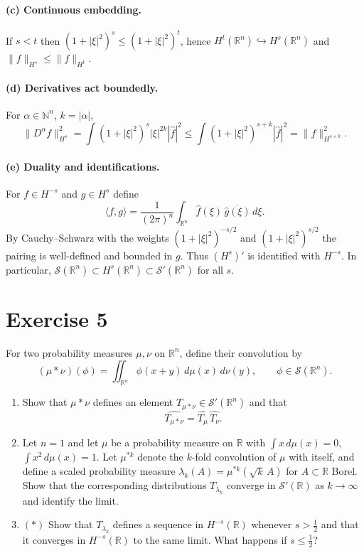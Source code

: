 \documentclass[12pt,a4paper]{article}
\theoremstyle{plain}
\theoremstyle{definition}
\theoremstyle{remark}
\theoremstyle{remark}
\begin{document}
\smallskip

\paragraph{(c) Continuous embedding.}
If $s<t$ then $(1+|\xi|^2)^s\le(1+|\xi|^2)^t$, hence $H^t(\mathbb R^n)\hookrightarrow H^s(\mathbb R^n)$ and
$\|f\|_{H^s}\le \|f\|_{H^t}$.

\smallskip

\paragraph{(d) Derivatives act boundedly.}
For $\alpha\in\mathbb N^n$, $k=|\alpha|$,
\[
\|D^\alpha f\|_{H^s}^2
=\int (1+|\xi|^2)^s |\xi|^{2k} |\widehat f|^2
\le \int (1+|\xi|^2)^{s+k} |\widehat f|^2
=\|f\|_{H^{s+k}}^2.
\]

\smallskip

\paragraph{(e) Duality and identifications.}
For $f\in H^{-s}$ and $g\in H^s$ define
\[
\langle f,g\rangle=\frac{1}{(2\pi)^n}\int_{\mathbb R^n}\widehat f(\xi)\,\overline{\widehat g(\xi)}\,d\xi.
\]
By Cauchy--Schwarz with the weights $(1+|\xi|^2)^{-s/2}$ and $(1+|\xi|^2)^{s/2}$ the pairing is well-defined and bounded in $g$.
Thus $(H^s)'$ is identified with $H^{-s}$. In particular, $\mathcal S(\mathbb R^n)\subset H^s(\mathbb R^n)\subset\mathcal S'(\mathbb R^n)$ for all $s$.

\bigskip

\section*{Exercise 5}


For two probability measures $\mu,\nu$ on $\mathbb R^n$, define their convolution by
\[
(\mu*\nu)(\phi)=\iint_{\mathbb R^n}\phi(x+y)\,d\mu(x)\,d\nu(y),\qquad \phi\in\mathcal S(\mathbb R^n).
\]

\begin{enumerate}[label=(\roman*)]
	\item Show that $\mu*\nu$ defines an element $T_{\mu*\nu}\in\mathcal S'(\mathbb R^n)$ and that
	\[
	\widehat{T_{\mu*\nu}}=\widehat{T_\mu}\,\widehat{T_\nu}.
	\]
	\item Let $n=1$ and let $\mu$ be a probability measure on $\mathbb R$ with
	$\int x\,d\mu(x)=0$, $\int x^2\,d\mu(x)=1$.
	Let $\mu^{*k}$ denote the $k$-fold convolution of $\mu$ with itself, and define a scaled probability measure
	$\lambda_k(A)=\mu^{*k}(\sqrt{k}\,A)$ for $A\subset\mathbb R$ Borel.
	Show that the corresponding distributions $T_{\lambda_k}$ converge in $\mathcal S'(\mathbb R)$ as $k\to\infty$
	and identify the limit.
	\item $(*)$ Show that $T_{\lambda_k}$ defines a sequence in $H^{-s}(\mathbb R)$ whenever $s>\tfrac12$
	and that it converges in $H^{-s}(\mathbb R)$ to the same limit.
	What happens if $s\le\tfrac12$?
\end{enumerate}
\end{document}
